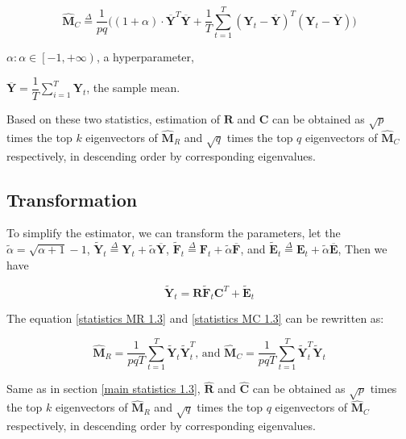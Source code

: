 \documentclass{article}[12pt]
\begin{document}
\begin{equation}
    \mathbf{\widehat{M}}_C  \overset{\Delta}{=} \dfrac{1}{pq}\Bigg((1 + \alpha) \cdot  \mathbf{\overline{Y}}^T\mathbf{\overline{Y}} + \dfrac{1}{T}\sum\limits_{t=1}^T(\mathbf{Y}_t - \mathbf{\overline{Y}})^T(\mathbf{Y}_t - \mathbf{\overline{Y}})\Bigg)
    \label{statistics MC 1.3}
\end{equation}


$\alpha: \alpha \in \left[-1, + \infty \right)$, a hyperparameter,

$\mathbf{\overline{Y}} = \dfrac{1}{T} \sum\limits_{i=1}^T\mathbf{Y}_t$, the sample mean.

\noindent Based on these two statistics, estimation of $\mathbf{R}$ and $\mathbf{C}$ can be obtained as $\sqrt{p}$ times the top $k$ eigenvectors of $\widehat{\mathbf{M}}_R$ and $\sqrt{q}$ times the top $q$ eigenvectors of $\widehat{\mathbf{M}}_C$ respectively, in descending order by corresponding eigenvalues.

\subsection{Transformation}\label{transformation 1.4}
\noindent To simplify the estimator, we can transform the parameters, let the $\tilde{\alpha} = \sqrt{\alpha + 1} - 1$, $\mathbf{\widetilde{Y}}_t \overset{\Delta}{=} \mathbf{Y}_t + \tilde{\alpha}\mathbf{\overline{Y}}$, $\mathbf{\widetilde{F}}_t \overset{\Delta}{=} \mathbf{F}_t + \tilde{\alpha}\mathbf{\overline{F}}$, and $\mathbf{\widetilde{E}}_t \overset{\Delta}{=} \mathbf{E}_t + \tilde{\alpha}\mathbf{\overline{E}}$, Then we have

\begin{equation}
    \mathbf{\widetilde{Y}}_t = \mathbf{R}\mathbf{\widetilde{F}}_t\mathbf{C}^T + \mathbf{\widetilde{E}}_t 
\end{equation}

\noindent The equation \ref{statistics MR 1.3} and \ref{statistics MC 1.3} can be rewritten as:

\begin{equation}
    \mathbf{\widehat{M}}_R = \frac{1}{pqT}\sum\limits_{t=1}^{T}\mathbf{\widetilde{Y}}_t\mathbf{\widetilde{Y}}_t^T \text{, and } \mathbf{\widehat{M}}_C = \frac{1}{pqT}\sum\limits_{t=1}^{T}\mathbf{\widetilde{Y}}_t^T\mathbf{\widetilde{Y}}_t
\end{equation}

\noindent Same as in section \ref{main statistics 1.3}, $\mathbf{\widehat{R}}$ and $\mathbf{\widehat{C}}$ can be obtained as $\sqrt{p}$ times the top $k$ eigenvectors of $\widehat{\mathbf{M}}_R$ and $\sqrt{q}$ times the top $q$ eigenvectors of $\widehat{\mathbf{M}}_C$ respectively, in descending order by corresponding eigenvalues.
\end{document}
